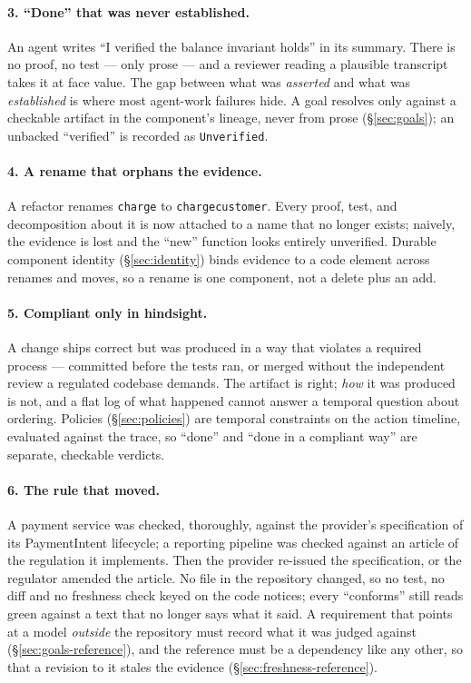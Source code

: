 \documentclass[11pt]{article}
\newcommand{\codeus}{\textunderscore\penalty100\relax}
\newcommand{\code}[1]{\texttt{\let\_\codeus #1}}
\begin{document}
\paragraph{3. ``Done'' that was never established.} An agent writes ``I verified the balance invariant holds''
in its summary. There is no proof, no test --- only prose --- and a reviewer reading a plausible transcript
takes it at face value. The gap between what was \emph{asserted} and what was \emph{established} is where most
agent-work failures hide. A goal resolves only against a checkable artifact in the component's lineage, never
from prose (\S\ref{sec:goals}); an unbacked ``verified'' is recorded as \code{Unverified}.

\paragraph{4. A rename that orphans the evidence.} A refactor renames \code{charge} to \code{charge\_customer}.
Every proof, test, and decomposition about it is now attached to a name that no longer exists; naively, the
evidence is lost and the ``new'' function looks entirely unverified. Durable component identity
(\S\ref{sec:identity}) binds evidence to a code element across renames and moves, so a rename is one component,
not a delete plus an add.

\paragraph{5. Compliant only in hindsight.} A change ships correct but was produced in a way that violates a
required process --- committed before the tests ran, or merged without the independent review a regulated
codebase demands. The artifact is right; \emph{how} it was produced is not, and a flat log of what happened
cannot answer a temporal question about ordering. Policies (\S\ref{sec:policies}) are temporal constraints on
the action timeline, evaluated against the trace, so ``done'' and ``done in a compliant way'' are separate,
checkable verdicts.

\paragraph{6. The rule that moved.} A payment service was checked, thoroughly, against the provider's
specification of its PaymentIntent lifecycle; a reporting pipeline was checked against an article of the
regulation it implements. Then the provider re-issued the specification, or the regulator amended the article.
No file in the repository changed, so no test, no diff and no freshness check keyed on the code notices;
every ``conforms'' still reads green against a text that no longer says what it said. A requirement that points
at a model \emph{outside} the repository must record what it was judged against (\S\ref{sec:goals-reference}),
and the reference must be a dependency like any other, so that a revision to it stales the evidence
(\S\ref{sec:freshness-reference}).
\end{document}
